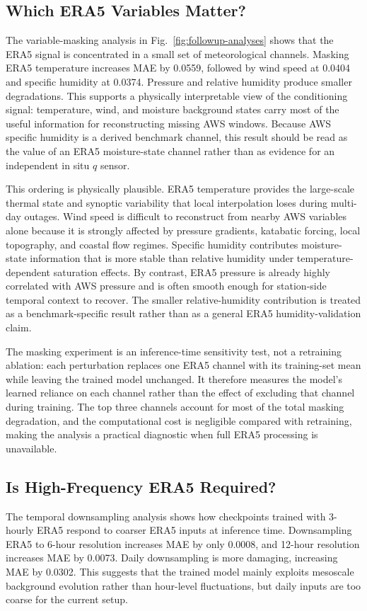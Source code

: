 \subsection{Which ERA5 Variables Matter?}
The variable-masking analysis in Fig.~\ref{fig:followup-analyses} shows that the ERA5 signal is concentrated in a small set of meteorological channels. Masking ERA5 temperature increases MAE by 0.0559, followed by wind speed at 0.0404 and specific humidity at 0.0374. Pressure and relative humidity produce smaller degradations. This supports a physically interpretable view of the conditioning signal: temperature, wind, and moisture background states carry most of the useful information for reconstructing missing AWS windows. Because AWS specific humidity is a derived benchmark channel, this result should be read as the value of an ERA5 moisture-state channel rather than as evidence for an independent in situ $q$ sensor.

This ordering is physically plausible. ERA5 temperature provides the large-scale thermal state and synoptic variability that local interpolation loses during multi-day outages. Wind speed is difficult to reconstruct from nearby AWS variables alone because it is strongly affected by pressure gradients, katabatic forcing, local topography, and coastal flow regimes. Specific humidity contributes moisture-state information that is more stable than relative humidity under temperature-dependent saturation effects. By contrast, ERA5 pressure is already highly correlated with AWS pressure and is often smooth enough for station-side temporal context to recover. The smaller relative-humidity contribution is treated as a benchmark-specific result rather than as a general ERA5 humidity-validation claim.

The masking experiment is an inference-time sensitivity test, not a retraining ablation: each perturbation replaces one ERA5 channel with its training-set mean while leaving the trained model unchanged. It therefore measures the model's learned reliance on each channel rather than the effect of excluding that channel during training. The top three channels account for most of the total masking degradation, and the computational cost is negligible compared with retraining, making the analysis a practical diagnostic when full ERA5 processing is unavailable.

\subsection{Is High-Frequency ERA5 Required?}
The temporal downsampling analysis shows how checkpoints trained with 3-hourly ERA5 respond to coarser ERA5 inputs at inference time. Downsampling ERA5 to 6-hour resolution increases MAE by only 0.0008, and 12-hour resolution increases MAE by 0.0073. Daily downsampling is more damaging, increasing MAE by 0.0302. This suggests that the trained model mainly exploits mesoscale background evolution rather than hour-level fluctuations, but daily inputs are too coarse for the current setup.


